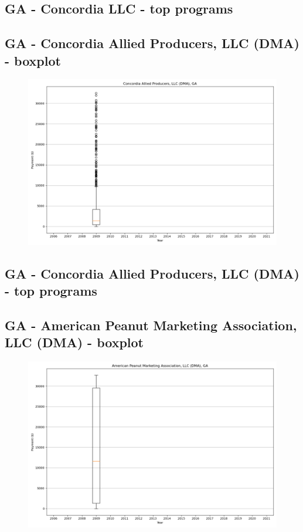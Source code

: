 \subsection*{GA - Concordia LLC - top programs}

\newpage
\subsection*{GA - Concordia Allied Producers, LLC (DMA) - boxplot}
\begin{figure}[h]
\centering
\includegraphics[width=7in]{../output/boxplots/counties/Concordia Allied Producers, LLC (DMA)-GA_boxplot.png}
\end{figure}


\subsection*{GA - Concordia Allied Producers, LLC (DMA) - top programs}

\newpage
\subsection*{GA - American Peanut Marketing Association, LLC (DMA) - boxplot}
\begin{figure}[h]
\centering
\includegraphics[width=7in]{../output/boxplots/counties/American Peanut Marketing Association, LLC (DMA)-GA_boxplot.png}
\end{figure}


